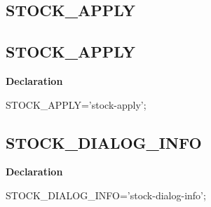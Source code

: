 \documentclass{report}
\newif\ifpdf
\begin{document}
\subsection*{\large{\textbf{STOCK{\_}APPLY}}\normalsize\hspace{1ex}\hrulefill}
\else
\subsection*{STOCK{\_}APPLY}
\fi
\label{common-STOCK_APPLY}
\begin{list}{}{
\setlength{\itemindent}{0cm}
\setlength{\listparindent}{0cm}
\setlength{\leftmargin}{\evensidemargin}
\addtolength{\leftmargin}{\tmplength}
\settowidth{\labelsep}{X}
\addtolength{\leftmargin}{\labelsep}
\setlength{\labelwidth}{\tmplength}
}
\item[\textbf{Declaration}\hfill]
\ifpdf
\begin{flushleft}
\fi
\begin{ttfamily}
STOCK{\_}APPLY='stock-apply';\end{ttfamily}

\ifpdf
\end{flushleft}
\fi

\end{list}
\ifpdf
\subsection*{\large{\textbf{STOCK{\_}DIALOG{\_}INFO}}\normalsize\hspace{1ex}\hrulefill}
\else
\subsection*{STOCK{\_}DIALOG{\_}INFO}
\fi
\label{common-STOCK_DIALOG_INFO}
\begin{list}{}{
\setlength{\itemindent}{0cm}
\setlength{\listparindent}{0cm}
\setlength{\leftmargin}{\evensidemargin}
\addtolength{\leftmargin}{\tmplength}
\settowidth{\labelsep}{X}
\addtolength{\leftmargin}{\labelsep}
\setlength{\labelwidth}{\tmplength}
}
\item[\textbf{Declaration}\hfill]
\ifpdf
\begin{flushleft}
\fi
\begin{ttfamily}
STOCK{\_}DIALOG{\_}INFO='stock-dialog-info';\end{ttfamily}

\ifpdf
\end{flushleft}
\fi

\end{list}
\ifpdf
\end{document}

